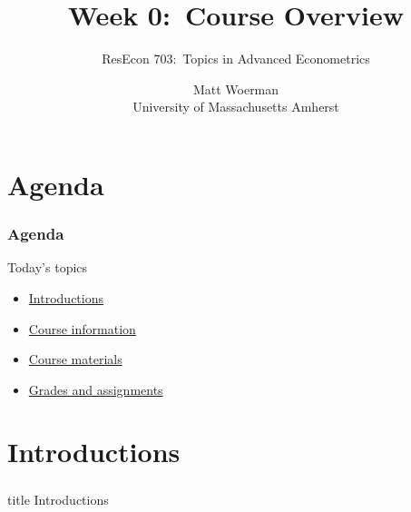 \documentclass{beamer}
\title[Week 0:\ Course Overview]{Week 0:\ Course Overview}
\author[ResEcon 703:\ Advanced Econometrics]{ResEcon 703:\ Topics in Advanced Econometrics}
\date{Matt Woerman\\University of Massachusetts Amherst}
\begin{document}
{ 
\begin{frame}[noframenumbering]
    \titlepage
\end{frame}
}

\section{Agenda}
\begin{frame}\frametitle{Agenda}
    Today's topics
    \begin{itemize}
    	\item \hyperlink{page.\getpagerefnumber{introductions}}{Introductions}
        \item \hyperlink{page.\getpagerefnumber{information}}{Course information}
        \item \hyperlink{page.\getpagerefnumber{materials}}{Course materials}
        \item \hyperlink{page.\getpagerefnumber{grades}}{Grades and assignments}
    \end{itemize}
\end{frame}

\section{Introductions}
\label{introductions}
\begin{frame}\frametitle{}
    \vfill
    \centering
    \begin{beamercolorbox}[center]{title}
        \Large Introductions
    \end{beamercolorbox}
    \vfill
\end{frame}
\end{document}
